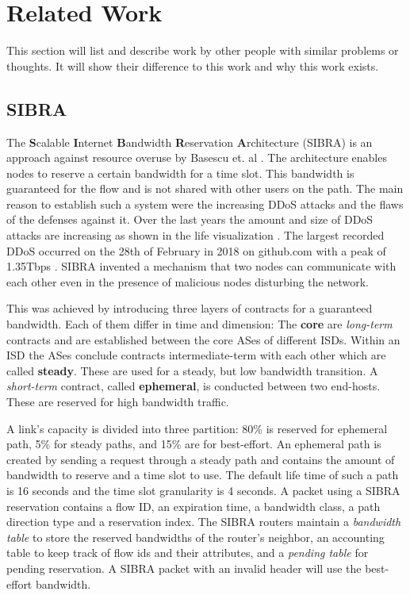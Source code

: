 \documentclass[thesis.tex]{subfiles}
\begin{document}
\section{Related Work}\label{chap:prevwork}

This section will list and describe work by other people with similar problems or thoughts. It will show their difference to this work and why this work exists.

\subsection{SIBRA} \label{sec:prevwork:sibra}

The \textbf{S}calable \textbf{I}nternet \textbf{B}andwidth \textbf{R}eservation \textbf{A}rchitecture (SIBRA) is an approach against resource overuse by Basescu et. al \cite{Basescu.2016}. The architecture enables nodes to reserve a certain bandwidth for a time slot. This bandwidth is guaranteed for the flow and is not shared with other users on the path. The main reason to establish such a system were the increasing DDoS attacks and the flaws of the defenses against it. Over the last years the amount and size of DDoS attacks are increasing as shown in the life visualization \cite{GoogleInc.2013}. The largest recorded DDoS occurred on the 28th of February in 2018 on github.com with a peak of 1.35Tbps \cite{Kottler.01.03.2018}. SIBRA invented a mechanism that two nodes can communicate with each other even in the presence of malicious nodes disturbing the network.

This was achieved by introducing three layers of contracts for a guaranteed bandwidth. Each of them differ in time and dimension: The \textbf{core} are \textit{long-term} contracts and are established between the core ASes of different ISDs. Within an ISD the ASes conclude contracts intermediate-term with each other which are called \textbf{steady}. These are used for a steady, but low bandwidth transition. A \textit{short-term} contract, called \textbf{ephemeral}, is conducted between two end-hosts. These are reserved for high bandwidth traffic. 

A link's capacity is divided into three partition: 80\% is reserved for ephemeral path, 5\% for steady paths, and 15\% are for best-effort. An ephemeral path is created by sending a request through a steady path and contains the amount of bandwidth to reserve and a time slot to use. The default life time of such a path is 16 seconds and the time slot granularity is 4 seconds. A packet using a SIBRA reservation contains a flow ID, an expiration time, a bandwidth class, a path direction type and a reservation index. The SIBRA routers maintain a \textit{bandwidth table} to store the reserved bandwidths of the router's neighbor, an accounting table to keep track of flow ids and their attributes, and a \textit{pending table} for pending reservation. A SIBRA packet with an invalid header will use the best-effort bandwidth.
\end{document}
